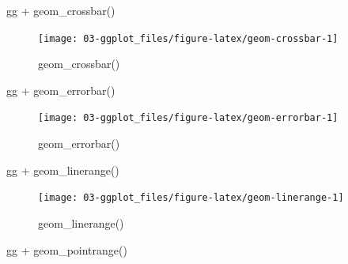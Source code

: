 \documentclass[
  oneside]{book}
\newenvironment{Shaded}{\begin{snugshade}}{\end{snugshade}}
\newcommand{\FunctionTok}[1]{\textcolor[rgb]{0.00,0.00,0.00}{#1}}
\newcommand{\NormalTok}[1]{#1}
\newcommand{\SpecialCharTok}[1]{\textcolor[rgb]{0.00,0.00,0.00}{#1}}
\begin{document}
\begin{Shaded}
\begin{Highlighting}[]
\NormalTok{gg }\SpecialCharTok{+} \FunctionTok{geom\_crossbar}\NormalTok{()}
\end{Highlighting}
\end{Shaded}

\begin{figure}

{\centering \texttt{[image: 03-ggplot\_files/figure-latex/geom-crossbar-1]} 

}

\caption{geom_crossbar()}\label{fig:geom-crossbar}
\end{figure}

\begin{Shaded}
\begin{Highlighting}[]
\NormalTok{gg }\SpecialCharTok{+} \FunctionTok{geom\_errorbar}\NormalTok{()}
\end{Highlighting}
\end{Shaded}

\begin{figure}

{\centering \texttt{[image: 03-ggplot\_files/figure-latex/geom-errorbar-1]} 

}

\caption{geom_errorbar()}\label{fig:geom-errorbar}
\end{figure}

\begin{Shaded}
\begin{Highlighting}[]
\NormalTok{gg }\SpecialCharTok{+} \FunctionTok{geom\_linerange}\NormalTok{()}
\end{Highlighting}
\end{Shaded}

\begin{figure}

{\centering \texttt{[image: 03-ggplot\_files/figure-latex/geom-linerange-1]} 

}

\caption{geom_linerange()}\label{fig:geom-linerange}
\end{figure}

\begin{Shaded}
\begin{Highlighting}[]
\NormalTok{gg }\SpecialCharTok{+} \FunctionTok{geom\_pointrange}\NormalTok{()}
\end{Highlighting}
\end{Shaded}
\end{document}
